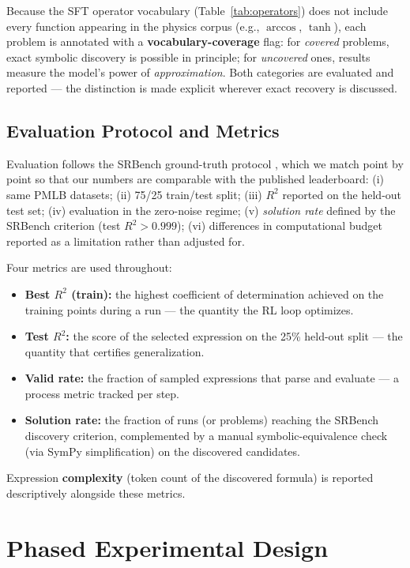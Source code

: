 Because the SFT operator vocabulary (Table~\ref{tab:operators}) does not include every function appearing in the physics corpus (e.g., $\arccos$, $\tanh$), each problem is annotated with a \textbf{vocabulary-coverage} flag: for \emph{covered} problems, exact symbolic discovery is possible in principle; for \emph{uncovered} ones, results measure the model's power of \emph{approximation}. Both categories are evaluated and reported --- the distinction is made explicit wherever exact recovery is discussed.

\subsection{Evaluation Protocol and Metrics}
\label{sec:eval_protocol}

Evaluation follows the SRBench ground-truth protocol \cite{lacava2021contemporary}, which we match point by point so that our numbers are comparable with the published leaderboard:
(i) same PMLB datasets;
(ii) 75/25 train/test split;
(iii) $R^2$ reported on the held-out test set;
(iv) evaluation in the zero-noise regime;
(v) \emph{solution rate} defined by the SRBench criterion (test $R^2 > 0.999$);
(vi) differences in computational budget reported as a limitation rather than adjusted for.

Four metrics are used throughout:
\begin{itemize}
    \item \textbf{Best $R^2$ (train):} the highest coefficient of determination achieved on the training points during a run --- the quantity the RL loop optimizes.
    \item \textbf{Test $R^2$:} the score of the selected expression on the 25\% held-out split --- the quantity that certifies generalization.
    \item \textbf{Valid rate:} the fraction of sampled expressions that parse and evaluate --- a process metric tracked per step.
    \item \textbf{Solution rate:} the fraction of runs (or problems) reaching the SRBench discovery criterion, complemented by a manual symbolic-equivalence check (via SymPy simplification) on the discovered candidates.
\end{itemize}
Expression \textbf{complexity} (token count of the discovered formula) is reported descriptively alongside these metrics.

\section{Phased Experimental Design}
\label{sec:design}

